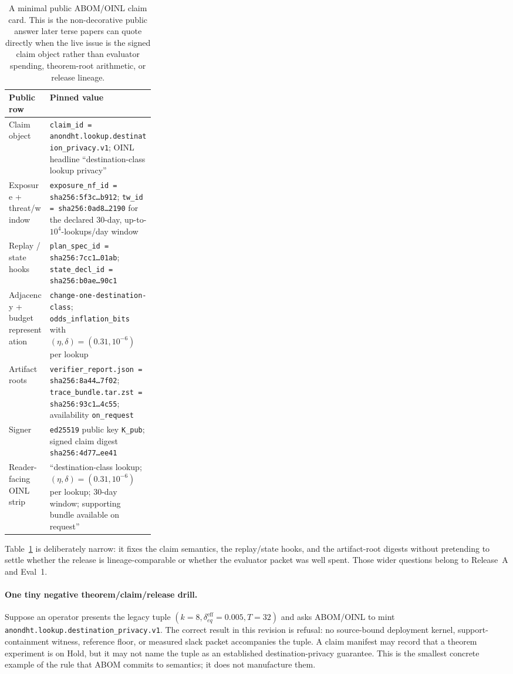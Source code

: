 \documentclass[11pt]{article}
\begin{document}
\begin{table}[t]
\centering
\small
\begin{tabularx}{0.97\linewidth}{@{}p{0.29\linewidth}X@{}}
\toprule
\textbf{Public row} & \textbf{Pinned value}\\
\midrule
Claim object & \texttt{claim\_id = anondht.lookup.destination\_privacy.v1}; OINL headline ``destination-class lookup privacy'' \\
Exposure + threat/window & \texttt{exposure\_nf\_id = sha256:5f3c\ldots b912}; \texttt{tw\_id = sha256:0ad8\ldots 2190} for the declared 30-day, up-to-\(10^4\)-lookups/day window \\
Replay / state hooks & \texttt{plan\_spec\_id = sha256:7cc1\ldots 01ab}; \texttt{state\_decl\_id = sha256:b0ae\ldots 90c1} \\
Adjacency + budget representation & \texttt{change-one-destination-class}; \texttt{odds\_inflation\_bits} with \((\eta,\delta)=(0.31,10^{-6})\) per lookup \\
Artifact roots & \texttt{verifier\_report.json = sha256:8a44\ldots 7f02}; \texttt{trace\_bundle.tar.zst = sha256:93c1\ldots 4c55}; availability \texttt{on\_request} \\
Signer & \texttt{ed25519} public key \texttt{K\_pub}; signed claim digest \texttt{sha256:4d77\ldots ee41} \\
Reader-facing OINL strip & ``destination-class lookup; \((\eta,\delta)=(0.31,10^{-6})\) per lookup; 30-day window; supporting bundle available on request'' \\
\bottomrule
\end{tabularx}
\caption{A minimal public ABOM/OINL claim card. This is the non-decorative public answer later terse papers can quote directly when the live issue is the signed claim object rather than evaluator spending, theorem-root arithmetic, or release lineage.}
\label{tab:minimal-abom-card}
\end{table}

Table~\ref{tab:minimal-abom-card} is deliberately narrow: it fixes the claim semantics, the replay/state hooks, and the artifact-root digests without pretending to settle whether the release is lineage-comparable or whether the evaluator packet was well spent. Those wider questions belong to Release~A and Eval~1.\cite{series:releaseproperty,series:evalnotary}


\paragraph{One tiny negative theorem/claim/release drill.}
Suppose an operator presents the legacy tuple $(k=8,\delta_{eq}^{\mathrm{eff}}=0.005,T=32)$ and asks ABOM/OINL to mint \texttt{anondht.lookup.destination\_privacy.v1}.  The correct result in this revision is refusal: no source-bound deployment kernel, support-containment witness, reference floor, or measured slack packet accompanies the tuple.  A claim manifest may record that a theorem experiment is on Hold, but it may not name the tuple as an established destination-privacy guarantee.  This is the smallest concrete example of the rule that ABOM commits to semantics; it does not manufacture them.
\end{document}
